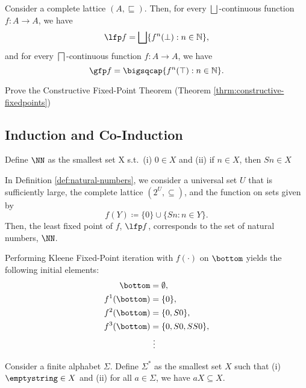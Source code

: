 \begin{theorem}
    \label{thrm:constructive-fixedpoints}
    Consider a complete lattice $(A, \sqsubseteq)$. Then, for every $\bigsqcup$-continuous function $f \colon A \to A$, we have
    \[
    \lfp f = \bigsqcup \{ f^n(\bot) : n \in \mathbb{N} \},
    \]
    and for every $\bigsqcap$-continuous function $f \colon A \to A$, we have
    \[
    \gfp f = \bigsqcap \{ f^n(\top) : n \in \mathbb{N} \}.
    \]
\end{theorem}    


\begin{exercise}
    Prove the Constructive Fixed-Point Theorem (Theorem \ref{thrm:constructive-fixedpoints})
\end{exercise}
	

\subsection{Induction and Co-Induction}

\begin{definition}
\label{def:natural-numbers}
    Define $\NN$ as the smallest set X s.t.\ (i) $0 \in X$ and (ii) if $n \in X$, then $S n \in X$
\end{definition}

\begin{remark}
    In Definition \ref{def:natural-numbers}, we consider a universal set $U$ that is sufficiently large, the complete lattice $(2^U, \subseteq)$, and the function on sets given by 
    \[
    f(Y) \coloneqq \{0\} \cup \{ S n : n \in Y \}.
    \]
    Then, the least fixed point of $f$, $\lfp f$, corresponds to the set of natural numbers, $\NN$.

    Performing Kleene Fixed-Point iteration with $f(\cdot)$ on $\bottom$ yields the following initial elements:
    \begin{align*}
        \bottom &= \emptyset, \\
        f^1(\bottom) &= \{0\}, \\
        f^2(\bottom) &= \{0, S0\}, \\
        f^3(\bottom) &= \{0, S0, SS0\}, \\
        &\ \vdots
    \end{align*}
\end{remark}




\begin{definition}
    Consider a finite alphabet $\Sigma$.
	Define $\Sigma^*$ as the smallest set $X$ such that (i) $\emptystring \in X$ and (ii) for all $a \in \Sigma$, we have $aX \subseteq X$.
\end{definition}

